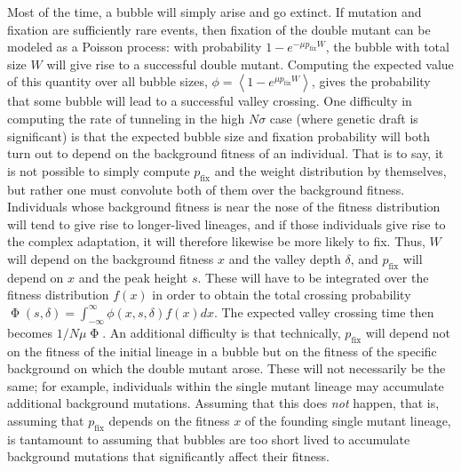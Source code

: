 \documentclass[rmp]{revtex4}
\newcommand{\pfix}{p_{\mathrm{fix}}}
\begin{document}
\begin{spacing}{1.5}
Most of the time, a bubble will simply arise and go extinct.
If mutation and fixation are sufficiently rare events, then fixation of the double mutant can be modeled as a Poisson process: with probability $1-e^{-\mu \pfix W}$, the bubble with total size $W$ will give rise to a successful double mutant.
Computing the expected value of this quantity over all bubble sizes, $\phi = \left< 1-e^{\mu \pfix W} \right>$, gives the probability that some bubble will lead to a successful valley crossing.
One difficulty in computing the rate of tunneling in the high $N\sigma$ case (where genetic draft is significant) is that the expected bubble size and fixation probability will both turn out to depend on the background fitness of an individual.
That is to say, it is not possible to simply compute $\pfix$ and the weight distribution by themselves, but rather one must convolute both of them over the background fitness.
Individuals whose background fitness is near the nose of the fitness distribution will tend to give rise to longer-lived lineages, and if those individuals give rise to the complex adaptation, it will therefore likewise be more likely to fix.
Thus, $W$ will depend on the background fitness $x$ and the valley depth $\delta$, and $\pfix$ will depend on $x$ and the peak height $s$.
These will have to be integrated over the fitness distribution $f(x)$ in order to obtain the total crossing probability $\upPhi(s,\delta) = \int_{-\infty}^\infty \phi(x,s,\delta) f(x) dx$.
The expected valley crossing time then becomes $1/N\mu\upPhi$.
An additional difficulty is that technically, $\pfix$ will depend not on the fitness of the initial lineage in a bubble but on the fitness of the specific background on which the double mutant arose.
These will not necessarily be the same; for example, individuals within the single mutant lineage may accumulate additional background mutations.
Assuming that this does \emph{not} happen, that is, assuming that $\pfix$ depends on the fitness $x$ of the founding single mutant lineage, is tantamount to assuming that bubbles are too short lived to accumulate background mutations that significantly affect their fitness.


\end{spacing}
\end{document}
